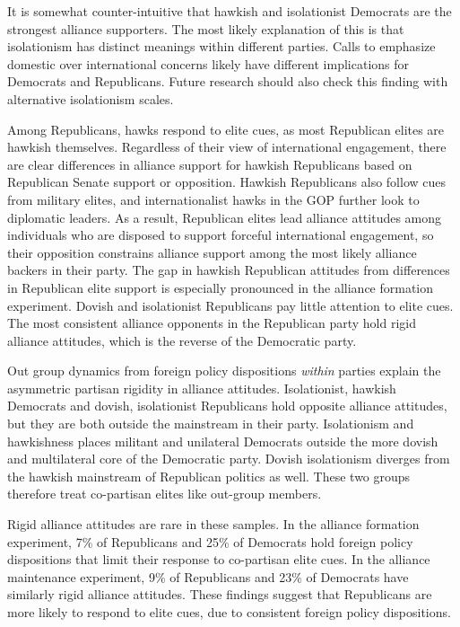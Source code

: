 \documentclass[12pt]{article}
\begin{document}
It is somewhat counter-intuitive that hawkish and isolationist Democrats are the strongest alliance supporters. 
The most likely explanation of this is that isolationism has distinct meanings within different parties.
Calls to emphasize domestic over international concerns likely have different implications for Democrats and Republicans.
Future research should also check this finding with alternative isolationism scales. 


Among Republicans, hawks respond to elite cues, as most Republican elites are hawkish themselves. 
Regardless of their view of international engagement, there are clear differences in alliance support for hawkish Republicans based on Republican Senate support or opposition.
Hawkish Republicans also follow cues from military elites, and internationalist hawks in the GOP further look to diplomatic leaders. 
As a result, Republican elites lead alliance attitudes among individuals who are disposed to support forceful international engagement, so their opposition constrains alliance support among the most likely alliance backers in their party. 
The gap in hawkish Republican attitudes from differences in Republican elite support is especially pronounced in the alliance formation experiment. 
Dovish and isolationist Republicans pay little attention to elite cues. 
The most consistent alliance opponents in the Republican party hold rigid alliance attitudes, which is the reverse of the Democratic party. 


Out group dynamics from foreign policy dispositions \textit{within} parties explain the asymmetric partisan rigidity in alliance attitudes. 
Isolationist, hawkish Democrats and dovish, isolationist Republicans hold opposite alliance attitudes, but they are both outside the mainstream in their party.
Isolationism and hawkishness places militant and unilateral Democrats outside the more dovish and multilateral core of the Democratic party. 
Dovish isolationism diverges from the hawkish mainstream of Republican politics as well. 
These two groups therefore treat co-partisan elites like out-group members.  


Rigid alliance attitudes are rare in these samples.
In the alliance formation experiment, 7\% of Republicans and 25\% of Democrats hold foreign policy dispositions that limit their response to co-partisan elite cues. 
In the alliance maintenance experiment, 9\% of Republicans and 23\% of Democrats have similarly rigid alliance attitudes.
These findings suggest that Republicans are more likely to respond to elite cues, due to consistent foreign policy dispositions.
\end{document}
